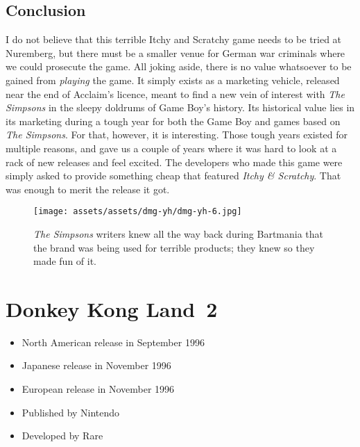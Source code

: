 \documentclass{book}
\begin{document}
\FloatBarrier\needspace{5pt}\section*{Conclusion}\nopagebreak[4]

I do not believe that this terrible Itchy and Scratchy game needs to be tried at Nuremberg, but there must be a smaller venue for German war criminals where we could prosecute the game. All joking aside, there is no value whatsoever to be gained from \emph{playing} the game. It simply exists as a marketing vehicle, released near the end of Acclaim’s licence, meant to find a new vein of interest with \emph{The Simpsons} in the sleepy doldrums of Game Boy’s history. Its historical value lies in its marketing during a tough year for both the Game Boy and games based on \emph{The Simpsons}. For that, however, it is interesting. Those tough years existed for multiple reasons, and gave us a couple of years where it was hard to look at a rack of new releases and feel excited. The developers who made this game were simply asked to provide something cheap that featured \emph{Itchy \& Scratchy}. That was enough to merit the release it got.

\begin{figure}[hbt]
\vskip 10pt
\centering \texttt{[image: assets/assets/dmg-yh/dmg-yh-6.jpg]}\par\pagetwodescription \emph{The Simpsons} writers knew all the way back during Bartmania that the brand was being used for terrible products; they knew so they made fun of it.
\vskip 6pt
\end{figure}


\begingroup \chapter*{Donkey Kong Land 2} \endgroup

\begin{itemize} \setlength\itemsep{-0.4em}
\item North American release in September 1996
\item Japanese release in November 1996
\item European release in November 1996
\item Published by Nintendo
\item Developed by Rare
\end{itemize}\noindent
\end{document}
